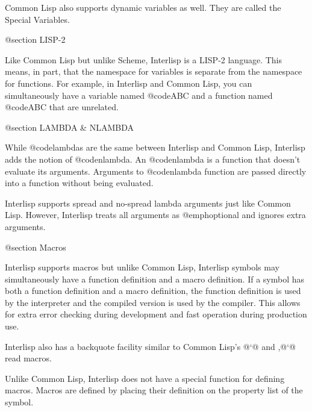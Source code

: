Common Lisp also supports dynamic variables as well.  They are called
the Special Variables.

@section LISP-2

Like Common Lisp but unlike Scheme, Interlisp is a LISP-2 language.
This means, in part, that the namespace for variables is separate from
the namespace for functions.  For example, in Interlisp and
Common Lisp, you can simultaneously have a variable named @code{ABC}
and a function named @code{ABC} that are unrelated.


@section LAMBDA & NLAMBDA

While @code{lambda}s are the same between Interlisp and Common Lisp,
Interlisp adds the notion of @code{nlambda}.  An @code{nlambda} is
a function that doesn't evaluate its arguments.  Arguments to 
@code{nlambda} function are passed directly into a function without 
being evaluated.

Interlisp supports spread and no-spread lambda arguments just like
Common Lisp.  However, Interlisp treats all arguments as
@emph{optional} and ignores extra arguments.

@section Macros

Interlisp supports macros but unlike Common Lisp, Interlisp symbols
may simultaneously have a function definition and a macro definition.
If a symbol has both a function definition and a macro definition, the
function definition is used by the interpreter and the compiled version
is used by the compiler.  This allows for extra error checking during 
development and fast operation during production use.

Interlisp also has a backquote facility similar to Common Lisp's @`@
and ,@`@ read macros.

Unlike Common Lisp, Interlisp does not have a special function for
defining macros.  Macros are defined by placing their definition on
the property list of the symbol.



